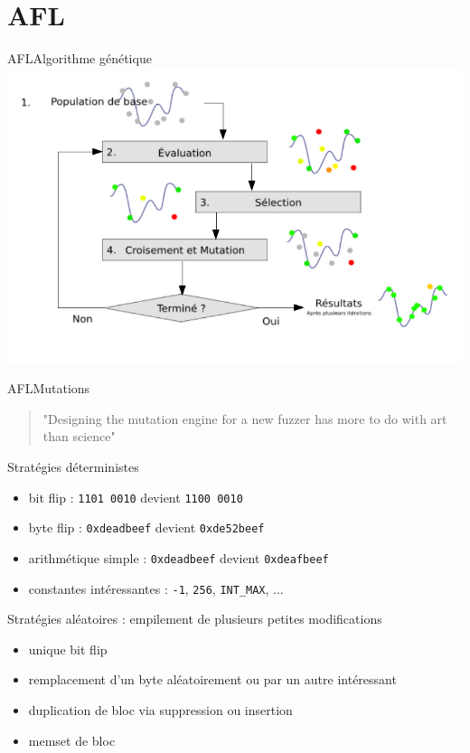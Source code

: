 \section{AFL}

\begin{frame}{AFL}{Algorithme génétique}
  \includegraphics[width=\textwidth]{../medias/schema_genetique.png}
\end{frame}

\begin{frame}{AFL}{Mutations}
  \begin{quote}\Large
  "Designing the mutation engine for a new fuzzer has more to do with art than science"
  \end{quote}
  \begin{exampleblock}{Stratégies déterministes}
    \begin{itemize}
      \item{bit flip : \lstinline{1101 0010} devient \lstinline{1100 0010}} \pause
      \item{byte flip : \lstinline{0xdeadbeef} devient \lstinline{0xde52beef}} \pause
      \item{arithmétique simple : \lstinline{0xdeadbeef} devient \lstinline{0xdeafbeef}} \pause
      \item{constantes intéressantes : \lstinline{-1}, \lstinline{256}, \lstinline{INT_MAX}, ...} \pause
    \end{itemize}
  \end{exampleblock}
  \begin{exampleblock}{Stratégies aléatoires : empilement de plusieurs petites modifications}
    \begin{itemize}
      \item{unique bit flip} \pause
      \item{remplacement d'un byte aléatoirement ou par un autre intéressant} \pause
      \item{duplication de bloc via suppression ou insertion} \pause
      \item{memset de bloc}
    \end{itemize}
  \end{exampleblock}
\end{frame}

